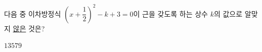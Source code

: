 다음 중 이차방정식 $\left(x+\dfrac{1}{2}\right)^2-k+3=0$이 근을 갖도록 하는 상수 $k$의 값으로 알맞지 \underline{않은} 것은?
\begin{choices32}{$1$}{$3$}{$5$}{$7$}{$9$}\end{choices32}
